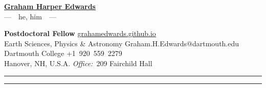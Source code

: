 \documentclass[10pt]{article}
\begin{document}
\begin{center}
\LARGE\textbf{\underline{Graham Harper Edwards}}\\ [.3em]
\large ---~~he, him~~---
\end{center}

\textbf{Postdoctoral Fellow} \hfill \href{https://grahamedwards.github.io}{grahamedwards.github.io} \\
Earth Sciences, Physics \& Astronomy \hfill Graham.H.Edwards{\small @dartmouth.edu} \\
Dartmouth College \hfill +1~920~559~2279  \\
Hanover, NH, U.S.A.	\hfill \textit{Office:}~209 Fairchild Hall


\vspace{1em}





















\begin{center}{\rule{2.5in}{0.5pt}}\end{center}  \begin{center}\vspace{-16pt} {\rule{2.5in}{0.5pt}}\end{center}



\end{document}
